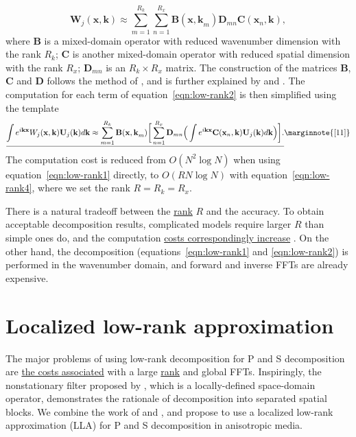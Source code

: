 \documentclass[manuscript,ulem,graphix,revised]{geophysics}
\begin{document}
\begin{equation}
\mathbf{W}_j(\mathbf{x,k})\approx \sum^{R_k}_{m=1}\sum^{R_x}_{n=1}\mathbf{B}(\mathbf{x,k}_{m})\mathbf{D}_{m n}\mathbf{C}(\mathbf{x}_{n},\mathbf{k}), 
\label{eqn:low-rank3}
\end{equation}
where $\mathbf{B}$ is a mixed-domain operator with reduced wavenumber dimension with the rank $R_k$; $\mathbf{C}$ is another mixed-domain operator with reduced spatial dimension with the rank $R_x$; $\mathbf{D}_{m n}$ is an $R_k \times R_x$ matrix. The construction of the matrices $\mathbf{B}$, $\mathbf{C}$ and $\mathbf{D}$ follows the method of \citet{engquist09}, and is further explained by \citet{fomel13} and \marginnote{[37]}\uline{\mbox{\citet{cheng14}}}. The computation for each term of equation~\ref{eqn:low-rank2} is then simplified using the template
\begin{equation}
\uline{\int e^{i\mathbf{kx}}W_j(\mathbf{x,k})\mathbf{U}_j(\mathbf{k})d\mathbf{k}\approx\sum^{R_k}_{m=1}\mathbf{B}(\mathbf{x,k}_{m}) \bigg[\sum^{R_x}_{n=1} \mathbf{D}_{m n} \Big(\int e^{i\mathbf{kx}} \mathbf{C}(\mathbf{x}_{n},\mathbf{k}) \mathbf{U}_j(\mathbf{k})d \mathbf{k}\Big)\bigg].} \marginnote{[11]}
\label{eqn:low-rank4}
\end{equation}
The computation cost is reduced from $O(N^2\log{N})$ when using equation~\ref{eqn:low-rank1} directly, to $O(RN\log{N})$ with equation~\ref{eqn:low-rank4}, where we set the rank $R=R_k=R_x$.

There is a natural tradeoff between the \uline{rank}\marginnote{[1]} $R$ and the accuracy. To obtain acceptable decomposition results, complicated models require larger $R$ than simple ones do, and the computation \uline{costs correspondingly increase} \marginnote{[12]}. On the other hand, the decomposition (equations~\ref{eqn:low-rank1} and \ref{eqn:low-rank2}) is performed in the wavenumber domain, and forward and inverse FFTs are already expensive. 


\section {Localized low-rank approximation}
\indent\indent
The major problems of using low-rank decomposition for P and S decomposition are \marginnote{[1, 13]} \uline{the costs associated} with a large \uline{rank} and global FFTs. Inspiringly, the nonstationary filter proposed by \citet{yan09}, which is a locally-defined space-domain operator, demonstrates the rationale of decomposition into separated spatial blocks. We combine the work of \citet{yan09} and \citet{cheng14}, and propose to use a localized low-rank approximation (LLA) for P and S decomposition in anisotropic media.
\end{document}
